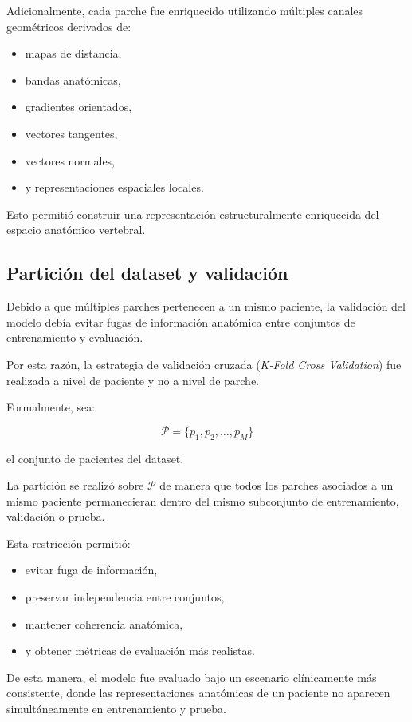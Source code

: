 \documentclass[conference]{IEEEtran}
\begin{document}
Adicionalmente, cada parche fue enriquecido utilizando múltiples canales geométricos derivados de:

\begin{itemize}
    \item mapas de distancia,
    \item bandas anatómicas,
    \item gradientes orientados,
    \item vectores tangentes,
    \item vectores normales,
    \item y representaciones espaciales locales.
\end{itemize}

Esto permitió construir una representación estructuralmente enriquecida del espacio anatómico vertebral.

\subsection{Partición del dataset y validación}

Debido a que múltiples parches pertenecen a un mismo paciente, la validación del modelo debía evitar fugas de información anatómica entre conjuntos de entrenamiento y evaluación.

Por esta razón, la estrategia de validación cruzada (\textit{K-Fold Cross Validation}) fue realizada a nivel de paciente y no a nivel de parche.

Formalmente, sea:

\[
\mathcal{P}=\{p_1,p_2,\dots,p_M\}
\]

el conjunto de pacientes del dataset.

La partición se realizó sobre $\mathcal{P}$ de manera que todos los parches asociados a un mismo paciente permanecieran dentro del mismo subconjunto de entrenamiento, validación o prueba.

Esta restricción permitió:

\begin{itemize}
    \item evitar fuga de información,
    \item preservar independencia entre conjuntos,
    \item mantener coherencia anatómica,
    \item y obtener métricas de evaluación más realistas.
\end{itemize}

De esta manera, el modelo fue evaluado bajo un escenario clínicamente más consistente, donde las representaciones anatómicas de un paciente no aparecen simultáneamente en entrenamiento y prueba.
\end{document}
